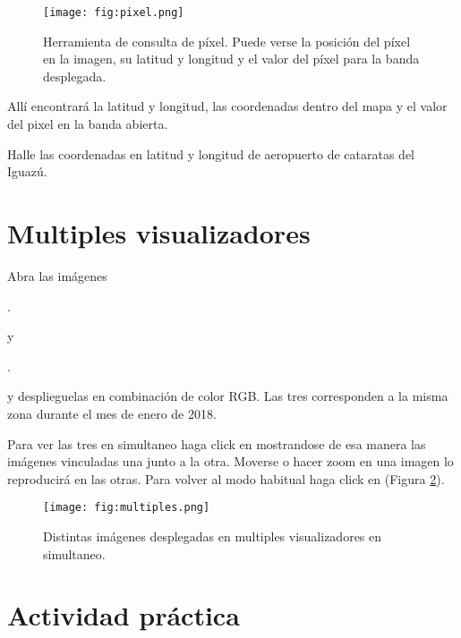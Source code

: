 \begin{figure}[h!]
    \centering
    \texttt{[image: fig:pixel.png]}
    \caption{Herramienta de consulta de píxel. Puede verse la posición del píxel en la imagen, su latitud y longitud y el valor del píxel para la banda desplegada.}
    \label{fig:pixel}
\end{figure}

Allí encontrará la latitud y longitud, las coordenadas dentro del mapa y el valor del pixel en la banda abierta.

Halle las coordenadas en latitud y longitud de aeropuerto de cataratas del Iguazú.

\section{Multiples visualizadores}

Abra las imágenes
\begin{center} .
\end{center}
y
\begin{center} .
\end{center}

y desplieguelas en combinación de color RGB. Las tres corresponden a la misma zona durante el mes de enero de 2018.

Para ver las tres en simultaneo haga click en  mostrandose de esa manera las imágenes vinculadas una junto a la otra. Moverse o hacer zoom en una imagen lo reproducirá en las otras. Para volver al modo habitual haga click en  (Figura \ref{fig:multiples}).

\begin{figure}[h!]
    \centering
    \texttt{[image: fig:multiples.png]}
    \caption{Distintas imágenes desplegadas en multiples visualizadores en simultaneo.}
    \label{fig:multiples}
\end{figure}

\section{Actividad práctica}

